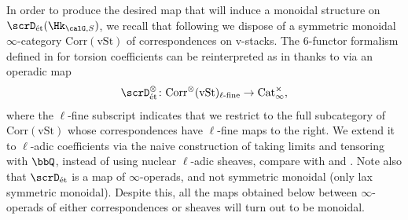 \documentclass[10pt, reqno]{amsart}
\theoremstyle{plain}
\theoremstyle{definition}
\numberwithin{equation}{section}
\begin{document}
	In order to produce the desired map that will induce a monoidal structure on $\scrD_{\mathrm{\acute{e}t}}(\Hk_{\calG,S})$, we recall that following \cite[Definition A.5.2]{Man22} we dispose of a symmetric monoidal $\infty$-category $\mathrm{Corr}(\mathrm{vSt})$ of correspondences on v-stacks. The 6-functor formalism defined in \cite{Sch17} for torsion coefficients can be reinterpreted as in \cite[Definition A.5.6]{Man22} thanks to \cite[Theorem 5.11]{Man22b} via an operadic map \begin{equation}\scrD_{\mathrm{\acute{e}t}}^\otimes\colon \mathrm{Corr}^\otimes(\mathrm{vSt})_{\ell\text{-}\mathrm{fine}} 
		\to \mathrm{Cat}_\infty^\times,\end{equation} where the $\ell$-fine subscript indicates that we restrict to the full subcategory of $\mathrm{Corr}(\mathrm{vSt})$ whose correspondences have $\ell$-fine maps to the right. We extend it to $\ell$-adic coefficients via the naive construction of taking limits and tensoring with $\bbQ$, instead of using nuclear $\ell$-adic sheaves, compare with \cite[Section 26]{Sch17} and \cite[page 6]{Man22b}. Note also that $\scrD_{\mathrm{\acute{e}t}}$ is a map of $\infty$-operads, and not symmetric monoidal (only lax symmetric monoidal). Despite this, all the maps obtained below between $\infty$-operads of either correspondences or sheaves will turn out to be monoidal.
	
\end{document}
